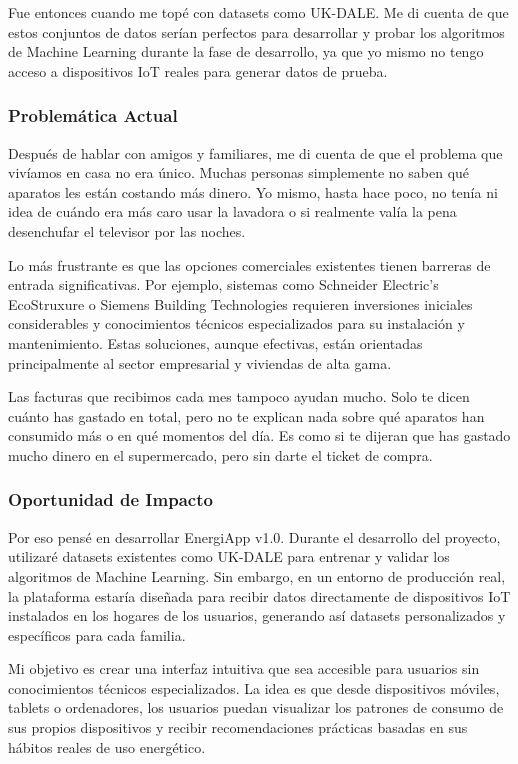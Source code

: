 \documentclass[12pt,a4paper,spanish]{article}
\begin{document}
Fue entonces cuando me topé con datasets como UK-DALE. Me di cuenta de que estos conjuntos de datos serían perfectos para desarrollar y probar los algoritmos de Machine Learning durante la fase de desarrollo, ya que yo mismo no tengo acceso a dispositivos IoT reales para generar datos de prueba.

\subsubsection{Problemática Actual}

Después de hablar con amigos y familiares, me di cuenta de que el problema que vivíamos en casa no era único. Muchas personas simplemente no saben qué aparatos les están costando más dinero. Yo mismo, hasta hace poco, no tenía ni idea de cuándo era más caro usar la lavadora o si realmente valía la pena desenchufar el televisor por las noches.

Lo más frustrante es que las opciones comerciales existentes tienen barreras de entrada significativas. Por ejemplo, sistemas como Schneider Electric's EcoStruxure o Siemens Building Technologies requieren inversiones iniciales considerables y conocimientos técnicos especializados para su instalación y mantenimiento. Estas soluciones, aunque efectivas, están orientadas principalmente al sector empresarial y viviendas de alta gama.

Las facturas que recibimos cada mes tampoco ayudan mucho. Solo te dicen cuánto has gastado en total, pero no te explican nada sobre qué aparatos han consumido más o en qué momentos del día. Es como si te dijeran que has gastado mucho dinero en el supermercado, pero sin darte el ticket de compra.

\subsubsection{Oportunidad de Impacto}

Por eso pensé en desarrollar EnergiApp v1.0. Durante el desarrollo del proyecto, utilizaré datasets existentes como UK-DALE para entrenar y validar los algoritmos de Machine Learning. Sin embargo, en un entorno de producción real, la plataforma estaría diseñada para recibir datos directamente de dispositivos IoT instalados en los hogares de los usuarios, generando así datasets personalizados y específicos para cada familia.

Mi objetivo es crear una interfaz intuitiva que sea accesible para usuarios sin conocimientos técnicos especializados. La idea es que desde dispositivos móviles, tablets o ordenadores, los usuarios puedan visualizar los patrones de consumo de sus propios dispositivos y recibir recomendaciones prácticas basadas en sus hábitos reales de uso energético.
\end{document}
